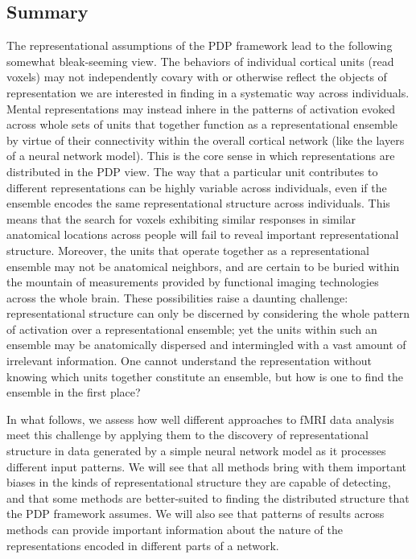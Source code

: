 \subsection{Summary}
The representational assumptions of the PDP framework lead to the following somewhat bleak-seeming view. The behaviors of individual cortical units (read voxels) may not independently covary with or otherwise reflect the objects of representation we are interested in finding in a systematic way across individuals. Mental representations may instead inhere in the patterns of activation evoked across whole sets of units that together function as a representational ensemble by virtue of their connectivity within the overall cortical network (like the layers of a neural network model). This is the core sense in which representations are distributed in the PDP view. The way that a particular unit contributes to different representations can be highly variable across individuals, even if the ensemble encodes the same representational structure across individuals. This means that the search for voxels exhibiting similar responses in similar anatomical locations across people will fail to reveal important representational structure. Moreover, the units that operate together as a representational ensemble may not be anatomical neighbors, and are certain to be buried within the mountain of measurements provided by functional imaging technologies across the whole brain. These possibilities raise a daunting challenge: representational structure can only be discerned by considering the whole pattern of activation over a representational ensemble; yet the units within such an ensemble may be anatomically dispersed and intermingled with a vast amount of irrelevant information. One cannot understand the representation without knowing which units together constitute an ensemble, but how is one to find the ensemble in the first place?

In what follows, we assess how well different approaches to fMRI data analysis meet this challenge by applying them to the discovery of representational structure in data generated by a simple neural network model as it processes different input patterns. We will see that all methods bring with them important biases in the kinds of representational structure they are capable of detecting, and that some methods are better-suited to finding the distributed structure that the PDP framework assumes. We will also see that patterns of results across methods can provide important information about the nature of the representations encoded in different parts of a network.

